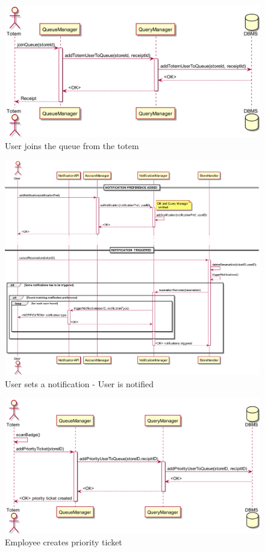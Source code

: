 \begin{figure}[H]
    \includegraphics[width=\linewidth]{uml/seq_join_queue_totem.png}
    \caption{User joins the queue from the totem}
    \label{fig:seq_join_queue_totem}
\end{figure}

\begin{figure}[H]
    \includegraphics[width=\linewidth]{uml/seq_user_gets_notified.png}
    \caption{User sets a notification - User is notified}
    \label{fig:seq_user_gets_notified}
\end{figure}

\begin{figure}[H]
    \includegraphics[width=\linewidth]{uml/seq_priority_ticket_creation.png}
    \caption{Employee creates priority ticket}
    \label{fig:seq_priority_ticket}
\end{figure}

